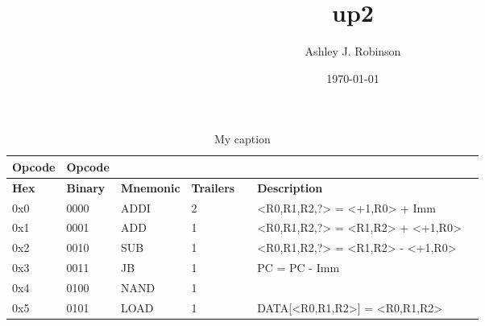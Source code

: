 \documentclass[a4paper]{article}
\title{up2}
\author{Ashley J. Robinson}
\date{\today}
\begin{document}
\maketitle

\section{}


\begin{table}[]
    \centering
    \caption{My caption}
    \label{my-label}
    \begin{tabular}{|l|l|l|l|l|l|l|}
        \hline
        \textbf{Opcode}     &   \textbf{Opcode} &                       &                       &                       &                                       &           \\ \hline
        \textbf{Hex}        &   \textbf{Binary} &   \textbf{Mnemonic}   &   \textbf{Trailers}   &    &   \textbf{Description}                &           \\ \hline
        0x0                 &   0000            &   ADDI                &   2                   &               &   <R0,R1,R2,?> = <+1,R0> + Imm        &           \\ \hline
        0x1                 &   0001            &   ADD                 &   1                   &               &   <R0,R1,R2,?> = <R1,R2> + <+1,R0>    &           \\ \hline
        0x2                 &   0010            &   SUB                 &   1                   &               &   <R0,R1,R2,?> = <R1,R2> - <+1,R0>           &           \\ \hline
        0x3                 &   0011            &   JB                &   1                   &               &   PC = PC - Imm           &           \\ \hline
        0x4                 &   0100            &   NAND                &  1             &           &           &           \\ \hline
        0x5                 &   0101            &   LOAD                &   1                   &              &   DATA[<R0,R1,R2>] = <R0,R1,R2>           &           \\ \hline

\end{tabular}
\end{table}
\end{document}
